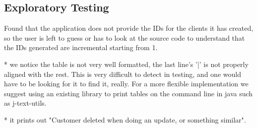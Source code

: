 \subsection{Exploratory Testing}

Found that the application does not provide the IDs for the clients  it has created, so the user is left to guess or has to look at the source code to understand that the IDs generated are incremental starting from 1. 

* we notice the table is not very well formatted, the last line's '|' is not properly aligned with the rest. This is very difficult to detect in testing, and one would have to be looking for it to find it, really. For a more flexible implementation we suggest using an existing library to print tables on the command line in java such as j-text-utils. 

* it prints out "Customer deleted when doing an update, or something similar". 